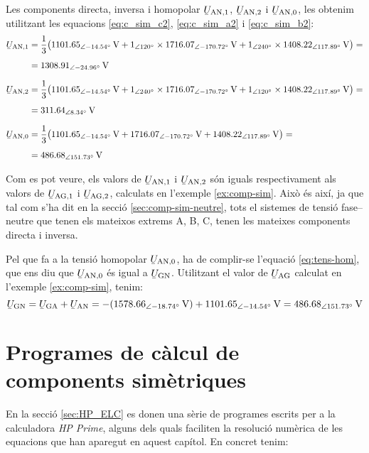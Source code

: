 \begin{exemple}
    Les components directa, inversa i homopolar $\cmplx{U}\ped{AN,1}$, $\cmplx{U}\ped{AN,2}$ i
    $\cmplx{U}\ped{AN,0}$, les obtenim utilitzant les equacions
    \eqref{eq:c_sim_c2}, \eqref{eq:c_sim_a2} i \eqref{eq:c_sim_b2}:
    \begin{align*}
        \cmplx{U}\ped{AN,1} &= \frac{1}{3} \big(
        \SIpd{1101,65}{-14,54}{V} + \numpd{1}{120} \times \SIpd{1716,07}{-170,72}{V} +
        \numpd{1}{240} \times \SIpd{1408,22}{117,89}{V} \big) =\\[1ex]
        &= \SIpd{1308,91}{-24,96}{V} \\[1.5ex]
        \cmplx{U}\ped{AN,2} &= \frac{1}{3} \big(
        \SIpd{1101,65}{-14,54}{V} + \numpd{1}{240} \times \SIpd{1716,07}{-170,72}{V} +
        \numpd{1}{120} \times \SIpd{1408,22}{117,89}{V} \big) =\\[1ex]
        &= \SIpd{311,64}{8,34}{V} \\[1.5ex]
        \cmplx{U}\ped{AN,0} &= \frac{1}{3} \big(
        \SIpd{1101,65}{-14,54}{V} + \SIpd{1716,07}{-170,72}{V} + \SIpd{1408,22}{117,89}{V} \big) = \\[1ex]
        &= \SIpd{486,68}{151,73}{V}
    \end{align*}

    Com es pot veure, els valors de $\cmplx{U}\ped{AN,1}$ i $\cmplx{U}\ped{AN,2}$ són iguals respectivament als valors de $\cmplx{U}\ped{AG,1}$ i $\cmplx{U}\ped{AG,2}$, calculats en l'exemple \ref{ex:comp-sim}.
    Això és així, ja que tal com s'ha dit en la secció \vref{sec:comp-sim-neutre}, tots el sistemes de tensió fase–neutre que tenen els mateixos extrems A, B, C, tenen les mateixes components directa i inversa.

    Pel que fa a la tensió homopolar $\cmplx{U}\ped{AN,0}$, ha de complir-se l'equació \eqref{eq:tens-hom}, que ens diu que $\cmplx{U}\ped{AN,0}$ és igual a $\cmplx{U}\ped{GN}$. Utilitzant el valor de  $\cmplx{U}\ped{AG}$ calculat en l'exemple \ref{ex:comp-sim}, tenim:
    \[
        \cmplx{U}\ped{GN} = \cmplx{U}\ped{GA} + \cmplx{U}\ped{AN} = -(\SIpd{1578,66}{-18,74}{V}) +
        \SIpd{1101,65}{-14,54}{V} = \SIpd{486,68}{151,73}{V}
    \]
\end{exemple}

\section{Programes de càlcul de components simètriques}\label{sec:calcul-comp-sim}

En la secció \vref{sec:HP_ELC} es donen  una sèrie de programes escrits per a la calculadora \emph{HP Prime},
 alguns dels quals faciliten la resolució numèrica de les equacions que han aparegut en aquest capítol. En concret tenim:

